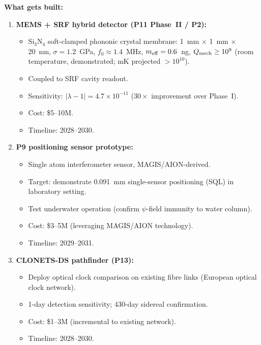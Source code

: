 \documentclass[11pt]{article}
\newcommand{\ee}[1]{\times 10^{#1}}
\newcommand{\lambdaone}{|\lambda{-}1|}
\begin{document}
\begin{tcolorbox}[colback=blue!5!white, colframe=blue!60!black,
  title=\textbf{Phase II: MEMS Hybrid + P9 Sensor Prototype}]

\textbf{What gets built:}

\begin{enumerate}
\item \textbf{MEMS + SRF hybrid detector (P11 Phase~II / P2):}
  \begin{itemize}[nosep]
    \item Si$_3$N$_4$ soft-clamped phononic crystal membrane:
      1~mm $\times$ 1~mm $\times$ 20~nm, $\sigma = 1.2$~GPa,
      $f_0 \approx 1.4$~MHz, $m_{\rm eff} = 0.6$~ng,
      $Q_{\rm mech} \geq 10^9$ (room temperature, demonstrated;
      mK projected $>10^{10}$).
    \item Coupled to SRF cavity readout.
    \item Sensitivity: $\lambdaone = 4.7\ee{-11}$ ($30\times$
      improvement over Phase~I).
    \item Cost: \$5--10M.
    \item Timeline: 2028--2030.
  \end{itemize}

\item \textbf{P9 positioning sensor prototype:}
  \begin{itemize}[nosep]
    \item Single atom interferometer sensor, MAGIS/AION-derived.
    \item Target: demonstrate 0.091~mm single-sensor positioning
      (SQL) in laboratory setting.
    \item Test underwater operation (confirm $\psi$-field immunity
      to water column).
    \item Cost: \$3--5M (leveraging MAGIS/AION technology).
    \item Timeline: 2029--2031.
  \end{itemize}

\item \textbf{CLONETS-DS pathfinder (P13):}
  \begin{itemize}[nosep]
    \item Deploy optical clock comparison on existing fibre links
      (European optical clock network).
    \item 1-day detection sensitivity; 430-day sidereal confirmation.
    \item Cost: \$1--3M (incremental to existing network).
    \item Timeline: 2028--2030.
  \end{itemize}
\end{enumerate}


\end{tcolorbox}
\end{document}
